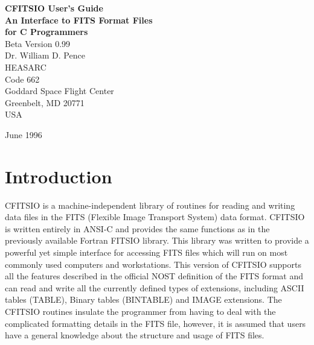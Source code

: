 %
\oddsidemargin=0.25in
\evensidemargin=0.00in
\textwidth=6.0in
\topmargin=0.0in
\textheight=8.75in
\parindent=0cm
\parskip=0.2cm


\begin{titlepage}
\normalsize
\vspace*{4.6cm}
\begin{center}
{\Huge \bf CFITSIO User's Guide}\\
\medskip 
\medskip 
\medskip 
\medskip 
{\LARGE \bf An Interface to FITS Format Files}\\
\medskip
\medskip
{\LARGE \bf for C Programmers}\\
\medskip
\medskip
\medskip
\medskip
{\Large Beta Version 0.99\\}
\bigskip
\vskip 3.0cm
{Dr. William D. Pence\\
HEASARC\\
Code 662\\
Goddard Space Flight Center\\
Greenbelt, MD 20771\\
USA}

\vfill
\bigskip
{\Large June 1996\\}
\end{center}
\vfill
\end{titlepage}

\begin{titlepage}
\vspace*{7.6cm}
\vfill
\end{titlepage}


\tableofcontents

\chapter{Introduction }

CFITSIO is a machine-independent library of routines for reading and
writing data files in the FITS (Flexible Image Transport System) data
format. CFITSIO is written entirely in ANSI-C and provides the same
functions as in the previously available Fortran FITSIO library. This
library was written to provide a powerful yet simple interface for
accessing FITS files which will run on most commonly used computers and
workstations. This version of CFITSIO supports all the features
described in the official NOST definition of the FITS format and can
read and write all the currently defined types of extensions, including
ASCII tables (TABLE), Binary tables (BINTABLE) and IMAGE extensions.
The CFITSIO routines insulate the programmer from having to deal with
the complicated formatting details in the FITS file, however, it is
assumed that users have a general knowledge about the structure and
usage of FITS files.

